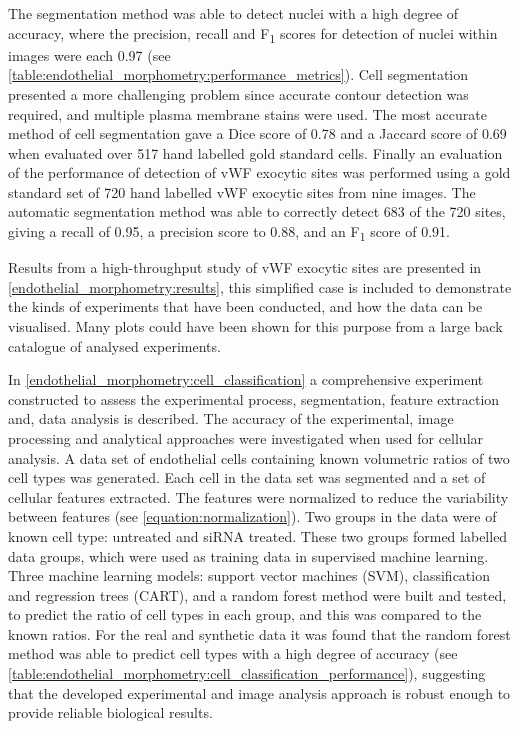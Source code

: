 The segmentation method was able to detect nuclei with a high degree of accuracy, where the precision, recall and F\textsubscript{1} scores for detection of nuclei within images were each 0.97 (see \autoref{table:endothelial_morphometry:performance_metrics}). Cell segmentation presented a more challenging problem since accurate contour detection was required, and multiple plasma membrane stains were used. The most accurate method of cell segmentation gave a Dice score of 0.78 and a Jaccard score of 0.69 when evaluated over 517 hand labelled gold standard cells. Finally an evaluation of the performance of detection of vWF exocytic sites was performed using a gold standard set of 720 hand labelled vWF exocytic sites from nine images. The automatic segmentation method was able to correctly detect 683 of the 720 sites, giving a recall of 0.95, a precision score to 0.88, and an F\textsubscript{1} score of 0.91.

Results from a high-throughput study of vWF exocytic sites are presented in \autoref{endothelial_morphometry:results}, this simplified case is included to demonstrate the kinds of experiments that have been conducted, and how the data can be visualised. Many plots could have been shown for this purpose from a large back catalogue of analysed experiments.

In \autoref{endothelial_morphometry:cell_classification} a comprehensive experiment constructed to assess the experimental process, segmentation, feature extraction and, data analysis is described. The accuracy of the experimental, image processing and analytical approaches were investigated when used for cellular analysis. A data set of endothelial cells containing known volumetric ratios of two cell types was generated. Each cell in the data set was segmented and a set of cellular features extracted. The features were normalized to reduce the variability between features (see \autoref{equation:normalization}). Two groups in the data were of known cell type: untreated and siRNA treated. These two groups formed labelled data groups, which were used as training data in supervised machine learning. Three machine learning models: support vector machines (SVM), classification and regression trees (CART), and a random forest method were built and tested, to predict the ratio of cell types in each group, and this was compared to the known ratios. For the real and synthetic data it was found that the random forest method was able to predict cell types with a high degree of accuracy (see \autoref{table:endothelial_morphometry:cell_classification_performance}), suggesting that the developed experimental and image analysis approach is robust enough to provide reliable biological results.
